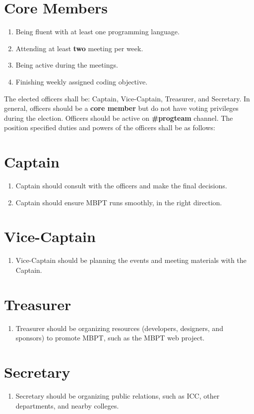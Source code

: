 \documentclass[20pt]{constitution}
\begin{document}
\section{Core Members}
\begin{enumerate} 
    \item Being fluent with at least one programming language.
    \item Attending at least {\bf two} meeting per week.
    \item Being active during the meetings.
    \item Finishing weekly assigned coding objective.
\end{enumerate}

The elected officers shall be: Captain, Vice-Captain, Treasurer, and Secretary.
In general, officers should be a {\bf core member} but do not have voting privileges during the election. 
Officers should be active on {\bf \#progteam} channel.
The position specified duties and powers of the officers shall be as follows:

\section{Captain}
\begin{enumerate}
    \item Captain should consult with the officers and make the final decisions.
    \item Captain should ensure MBPT runs smoothly, in the right direction. 
\end{enumerate}

\section{Vice-Captain}
\begin{enumerate}
    \item Vice-Captain should be planning the events and meeting materials with the Captain.
\end{enumerate}

\section{Treasurer}
\begin{enumerate}
    \item Treasurer should be organizing resources (developers, designers, and sponsors) 
    to promote MBPT, such as the MBPT web project.
\end{enumerate}

\section{Secretary}
\begin{enumerate}
    \item Secretary should be organizing public relations, such as ICC, other departments, and nearby colleges. 
\end{enumerate}


\end{document}
